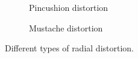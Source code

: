 \documentclass[12pt]{article}
\begin{document}
\begin{figure}[h!]
\begin{subfigure}{0.30\linewidth}
		\caption{Pincushion distortion}
		\label{pincushion}
	\end{subfigure}\hfill
	\begin{subfigure}{0.30\linewidth}
		\centering
		\caption{Mustache distortion}
		\label{mustache}
	\end{subfigure}
	\caption{Different types of radial distortion.}
	\label{types}
\end{figure}
\end{document}
